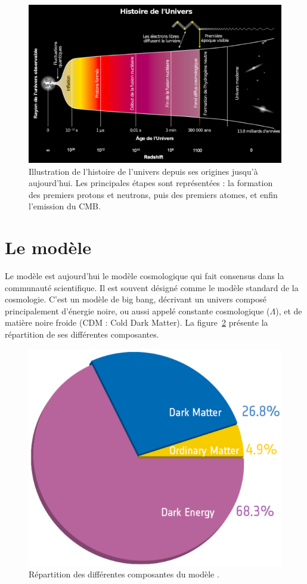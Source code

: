 \documentclass[11pt, twoside, a4paper, openright]{report}
\begin{document}
\begin{figure}
  \centering
  \includegraphics[scale=0.35]{univershistory2}
  \caption{Illustration de l'histoire de l'univers depuis ses origines jusqu'à aujourd'hui. Les principales étapes sont représentées : la formation des premiers protons et neutrons, puis des premiers atomes, et enfin l'emission du CMB.}
  \label{fig:univershistory}
\end{figure}


\section{Le modèle \lcdm{}}

Le modèle \lcdm{} est aujourd'hui le modèle cosmologique qui fait consensus dans la communauté scientifique. Il est souvent désigné comme le modèle standard de la cosmologie. C'est un modèle de big bang, décrivant un univers composé principalement d'énergie noire, ou aussi appelé constante cosmologique ($\Lambda$), et de matière noire froide (CDM : Cold Dark Matter). La figure~\ref{fig:lcdm} présente la répartition de ses différentes composantes.
\begin{figure}
  \centering
  \includegraphics[scale=0.3]{lcdm}
  \caption{Répartition des différentes composantes du modèle \lcdm{}.}
  \label{fig:lcdm}
\end{figure}
\end{document}
